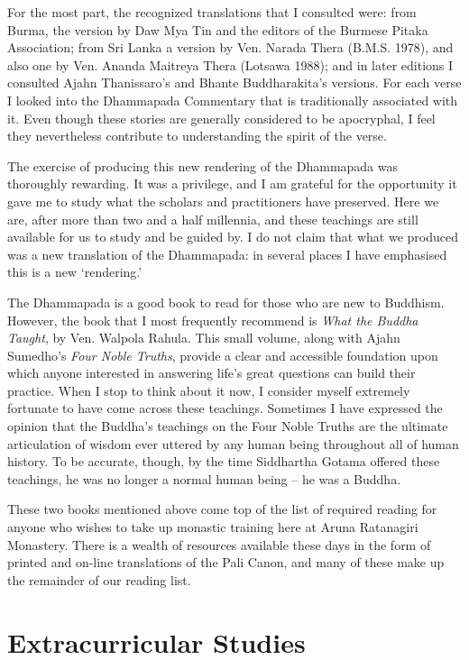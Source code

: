For the most part, the recognized translations that I consulted were:
from Burma, the version by Daw Mya Tin and the editors of the
Burmese Pitaka Association\cite{burmese-pitaka}; from Sri Lanka a
version by Ven. Narada Thera (B.M.S. 1978), and also one by Ven. Ananda
Maitreya Thera (Lotsawa 1988); and in later editions I consulted
Ajahn Thanissaro's and Bhante Buddharakita's\cite{buddharakita} versions.
For each verse I looked into the Dhammapada Commentary\cite{commentary}
that is traditionally associated with it. Even
though these stories are generally considered to be apocryphal, I feel
they nevertheless contribute to understanding the spirit of the verse.

The exercise of producing this new rendering of the Dhammapada was
thoroughly rewarding. It was a privilege, and I am grateful for the
opportunity it gave me to study what the scholars and practitioners have
preserved. Here we are, after more than two and a half millennia, and
these teachings are still available for us to study and be guided by. I
do not claim that what we produced was a new translation of the
Dhammapada: in several places I have emphasised this is a new
`rendering.'

The Dhammapada is a good book to read for those who are new to Buddhism.
However, the book that I most frequently recommend is \emph{What the
  Buddha Taught}, by Ven. Walpola Rahula. This small volume,
along with Ajahn Sumedho's \emph{Four Noble Truths}\cite{truths}, provide a clear and accessible foundation
upon which anyone interested in answering life's great questions can
build their practice. When I stop to think about it now, I consider
myself extremely fortunate to have come across these teachings. Sometimes I have expressed the opinion that the Buddha's teachings on the Four
Noble Truths are the ultimate articulation of wisdom ever uttered by any
human being throughout all of human history. To be accurate, though, by
the time Siddhartha Gotama offered these teachings, he was no longer a
normal human being -- he was a Buddha.

These two books mentioned above come top of the list of required reading
for anyone who wishes to take up monastic training here at Aruna
Ratanagiri Monastery. There is a wealth of resources available these
days in the form of printed and on-line translations of the Pali Canon,
and many of these make up the remainder of our reading list.

\section{Extracurricular Studies}

